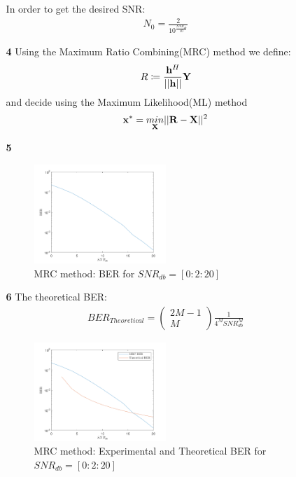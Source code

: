 \documentclass[12pt]{article}
\begin{document}
\begin{enumerate}
\begin{enumerate}
			In order to get the desired SNR:
			\begin{align*}
				N_0 = \frac{2}{10^{\frac{SNR_{db}}{10}}}
			\end{align*}
		
			\item[\bf 4]
			Using the Maximum Ratio Combining(MRC) method we define:
			\begin{align*}
				R\coloneqq\frac{{\bf h}^H}{||{\bf h||}}{\bf Y}
			\end{align*}
			and decide using the Maximum Likelihood(ML) method
			\begin{align*}
				{\bf x}^* = \underset{{\bf X}}{min}||{\bf R}-{\bf X}||^2
			\end{align*}
		
			\newpage
			\item[\bf 5]
			\begin{figure}[h!]
				\centering
				\includegraphics[width=0.5\textwidth]{fig1.png}
				\caption{MRC method: BER for $SNR_{db}=[0:2:20]$}
			\end{figure}
			
			
			\item[\bf 6]
			The theoretical BER:
			\begin{align*}
				BER_{Theoretical}=\begin{pmatrix}
					2M-1 \\ M
				\end{pmatrix}\frac{1}{4^MSNR_{db}^M}
			\end{align*}
			\begin{figure}[h!]
				\centering
				\includegraphics[width=0.5\textwidth]{fig2.png}
				\caption{MRC method: Experimental and Theoretical BER for $SNR_{db}=[0:2:20]$}
			\end{figure}
			

\end{enumerate}
\end{enumerate}
\end{document}
